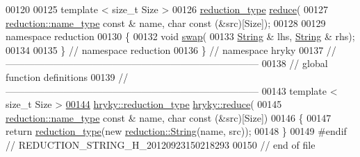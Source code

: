 \begin{DoxyCode}
00120 
00125     \textcolor{keyword}{template} < \textcolor{keywordtype}{size\_t} Size >
00126     \hyperlink{classhryky_1_1_intrusive_ptr}{reduction_type} \hyperlink{namespacehryky_1_1reduction_a064022926c530d18aeb1b2abdf71800b}{reduce}(
00127         \hyperlink{classhryky_1_1reduction_1_1_string}{reduction::name_type} \textcolor{keyword}{const} & name, \textcolor{keywordtype}{char} \textcolor{keyword}{const} (&src)[Size]);
00128 
00129 \textcolor{keyword}{namespace }reduction
00130 \{
00132     \textcolor{keywordtype}{void} \hyperlink{namespacehryky_1_1reduction_a493c83efdf5f9e9c49ba77e1b65325a1}{swap}(
00133         \hyperlink{classhryky_1_1reduction_1_1_string}{String} & lhs, \hyperlink{classhryky_1_1reduction_1_1_string}{String} & rhs);
00134 
00135 \} \textcolor{comment}{// namespace reduction}
00136 \} \textcolor{comment}{// namespace hryky}
00137 \textcolor{comment}{//
      ------------------------------------------------------------------------------}
00138 \textcolor{comment}{// global function definitions}
00139 \textcolor{comment}{//
      ------------------------------------------------------------------------------}
00143 \textcolor{comment}{}\textcolor{keyword}{template} < \textcolor{keywordtype}{size\_t} Size >
\hypertarget{reduction__string_8h_source_l00144}{}\hyperlink{namespacehryky_ad7fa2b6d153fe3ccc4318fb9c9ea81a7}{00144} \hyperlink{classhryky_1_1_intrusive_ptr}{hryky::reduction_type} \hyperlink{namespacehryky_1_1reduction_a064022926c530d18aeb1b2abdf71800b}{hryky::reduce}(
00145     \hyperlink{classhryky_1_1reduction_1_1_string}{reduction::name_type} \textcolor{keyword}{const} & name, \textcolor{keywordtype}{char} \textcolor{keyword}{const} (&src)[Size])
00146 \{
00147     \textcolor{keywordflow}{return} \hyperlink{namespacehryky_a343a9a4c36a586be5c2693156200eadc}{reduction_type}(\textcolor{keyword}{new} \hyperlink{classhryky_1_1reduction_1_1_string}{reduction::String}(name, src));
00148 \}
00149 \textcolor{preprocessor}{#endif // REDUCTION\_STRING\_H\_20120923150218293}
00150 \textcolor{preprocessor}{}\textcolor{comment}{// end of file}
\end{DoxyCode}
